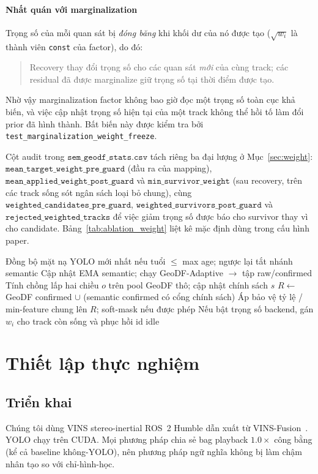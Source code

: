 \documentclass{ieeeaccess}
\begin{document}
\paragraph{Nhất quán với marginalization}
Trọng số của mỗi quan sát bị \emph{đóng băng} khi khối dư của nó được tạo (\(\sqrt{w_i}\) là thành viên \texttt{const} của factor), do đó:
\begin{quote}
Recovery thay đổi trọng số cho các quan sát \emph{mới} của cùng track; các residual đã được marginalize giữ trọng số tại thời điểm được tạo.
\end{quote}
Nhờ vậy marginalization factor không bao giờ đọc một trọng số toàn cục khả biến, và việc cập nhật trọng số hiện tại của một track không thể hồi tố làm đổi prior đã hình thành. Bất biến này được kiểm tra bởi \texttt{test\_marginalization\_weight\_freeze}.

Cột audit trong \(\texttt{sem\_geodf\_stats.csv}\) tách riêng ba đại lượng ở Mục~\ref{sec:weight}: \(\texttt{mean\_target\_weight\_pre\_guard}\) (đầu ra của mapping), \(\texttt{mean\_applied\_weight\_post\_guard}\) và \(\texttt{min\_survivor\_weight}\) (sau recovery, trên các track sống sót ngân sách loại bỏ chung), cùng \(\texttt{weighted\_candidates\_pre\_guard}\), \(\texttt{weighted\_survivors\_post\_guard}\) và \(\texttt{rejected\_weighted\_tracks}\) để việc giảm trọng số được báo cho survivor thay vì cho candidate.
Bảng~\ref{tab:ablation_weight} liệt kê mặc định dùng trong cấu hình paper.

\begin{algorithm}[t]
\caption{Bước front-end Sem-GeoDF (mỗi khung stereo)}
\label{alg:semgeodf}
\begin{algorithmic}[1]
\State Đồng bộ mặt nạ YOLO mới nhất nếu tuổi \(\le\) max age; ngược lại tắt nhánh semantic
\State Cập nhật EMA semantic; chạy GeoDF-Adaptive \(\to\) tập raw/confirmed
\State Tính chồng lấp hai chiều \(o\) trên pool GeoDF thô; cập nhật chính sách \(s\)
\State \(R \gets\) GeoDF confirmed \(\cup\) (semantic confirmed có cổng chính sách)
\State Áp bảo vệ tỷ lệ / min-feature chung lên \(R\); soft-mask nếu được phép
\State Nếu bật trọng số backend, gán \(w_i\) cho track còn sống và phục hồi id idle
\end{algorithmic}
\end{algorithm}

\section{Thiết lập thực nghiệm}
\subsection{Triển khai}
Chúng tôi dùng VINS stereo-inertial ROS~2 Humble dẫn xuất từ VINS-Fusion~\cite{qin2019vinsfusion}.
YOLO chạy trên CUDA.
Mọi phương pháp chia sẻ bag playback \(1.0\times\) công bằng (kể cả baseline không-YOLO), nên phương pháp ngữ nghĩa không bị làm chậm nhân tạo so với chỉ-hình-học.
\end{document}
